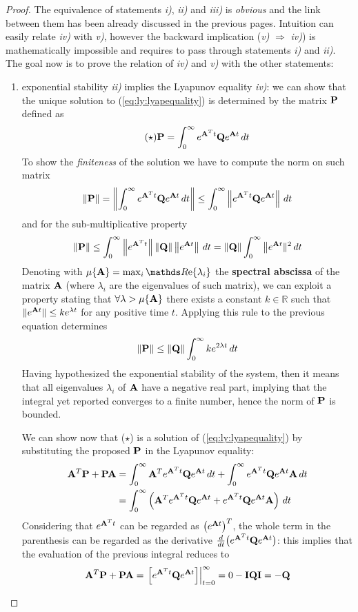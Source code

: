 	\begin{proof}
		The equivalence of statements \textit{i)}, \textit{ii)} and \textit{iii)} is \textit{obvious} and the link between them has been already discussed in the previous pages. Intuition can easily relate \textit{iv)} with \textit{v)}, however the backward implication (\textit{v)} $\Rightarrow$ \textit{iv)}) is mathematically impossible and requires to pass through statements \textit{i)} and \textit{ii)}. The goal now is to prove the relation of \textit{iv)} and \textit{v)} with the other statements:
	\begin{enumerate}[\itshape a)]
		\item exponential stability \textit{ii)} implies the Lyapunov equality \textit{iv)}: we can show that the unique solution to (\ref{eq:ly:lyapequality}) is determined by the matrix $\P$ defined as
		\[ \tag{$\star$} \P = \int_0^\infty e^{\A^Tt} \Q e^{\A t}\, dt \]
		To show the \textit{finiteness} of the solution we have to compute the norm on such matrix
		\[ \|\P\| = \left\| \int_0^\infty e^{\A^Tt} \Q e^{\A t} \, dt \right\| \leq \int_0^\infty \left\| e^{\A^Tt} \Q e^{\A t}\right\| \, dt \]
		and for the sub-multiplicative property
		\[ \|\P\| \leq \int_0^\infty \left\| e^{\A^Tt} \right\|  \|\Q\| \left\| e^{\A t}\right\| \, dt = \|\Q\| \int_0^\infty \big\| e^{\A t}\|^2\, dt \]
		Denoting with $\mu\{\A\} = \max_i \Re{\lambda_i}$ the \textbf{spectral abscissa} of the matrix $\A$ (where $\lambda_i$ are the eigenvalues of such matrix), we can exploit a property stating that $\forall \lambda > \mu\{\A\}$ there exists a constant $k\in \mathds R$ such that $\|e^{\A t}\| \leq k e^{\lambda t}$ for any positive time $t$. Applying this rule to the previous equation determines
		\[ \|\P\| \leq \|\Q\| \int_0^\infty k e^{2\lambda t}\, dt \]
		Having hypothesized the exponential stability of the system, then it means that all eigenvalues $\lambda_i$ of $\A$ have a negative real part, implying that the integral yet reported converges to a finite number, hence the norm of $\P$ is bounded.
		
		We can show now that ($\star$) is a solution of (\ref{eq:ly:lyapequality}) by substituting the proposed $\P$ in the Lyapunov equality:
		\begin{align*}
			\A^T \P + \P \A & = \int_0^\infty \A^T e^{\A^Tt} \Q e^{\A t}\, dt + \int_0^\infty e^{\A^Tt} \Q e^{\A t} \A \, dt \\
			& = \int_0^\infty \left( \A^T e^{\A^Tt} \Q e^{\A t} + e^{\A^Tt} \Q e^{\A t} \A \right)\, dt
		\end{align*}
		Considering that $e^{\A^T t}$ can be regarded as $\big(e^{\A t}\big)^T$, the whole term in the parenthesis can be regarded as the derivative $\frac d{dt} \big(e^{\A^T t} \Q e^{\A t}\big)$: this implies that the evaluation of the previous integral reduces to
		\[ \A^T \P + \P \A = \left. \left[ e^{\A^Tt} \Q e^{\A t}  \right]\right|_{t=0}^\infty = 0 - \I \Q \I  = - \Q \]
		

\end{enumerate}
\end{proof}
